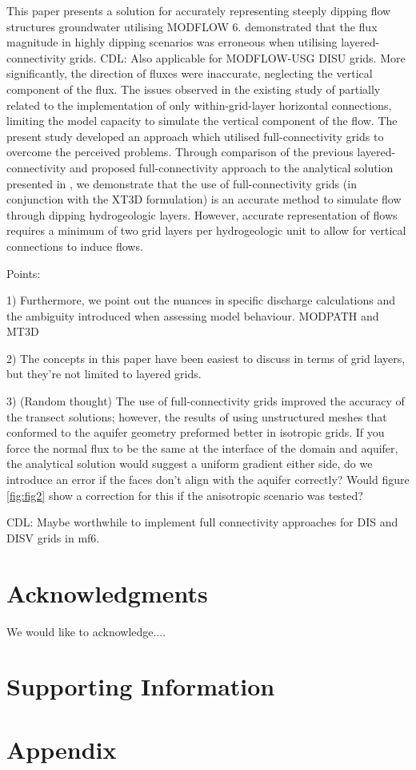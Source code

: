 \documentclass{article}
\begin{document}
This paper presents a solution for accurately representing steeply dipping flow structures groundwater utilising MODFLOW 6. \citep{bardot2022} demonstrated that the flux magnitude in highly dipping scenarios was erroneous when utilising layered-connectivity grids.  {\color{red} CDL: Also applicable for MODFLOW-USG DISU grids.} More significantly, the direction of fluxes were inaccurate, neglecting the vertical component of the flux. The issues observed in the existing study of \citep{bardot2022} partially related to the implementation of only within-grid-layer horizontal connections, limiting the model capacity to simulate the vertical component of the flow. The present study developed an approach which utilised full-connectivity grids \cite{modflow6gwf} to overcome the perceived problems. Through comparison of the previous layered-connectivity and proposed full-connectivity approach to the analytical solution presented in \citep{bardot2022}, we demonstrate that the use of full-connectivity grids (in conjunction with the XT3D formulation) is an accurate method to simulate flow through dipping hydrogeologic layers. However, accurate representation of flows requires a minimum of two grid layers per hydrogeologic unit to allow for vertical connections to induce flows. 

Points:

1) Furthermore, we point out the nuances in specific discharge calculations and the ambiguity introduced when assessing model behaviour.  MODPATH and MT3D

2) The concepts in this paper have been easiest to discuss in terms of grid layers, but they're not limited to layered grids.

3) (Random thought) The use of full-connectivity grids improved the accuracy of the transect solutions; however, the results of \citep{bardot2022} using unstructured meshes that conformed to the aquifer geometry preformed better in isotropic grids. If you force the normal flux to be the same at the interface of the domain and aquifer, the analytical solution would suggest a uniform gradient either side, do we introduce an error if the faces don't align with the aquifer correctly?  Would figure \ref{fig:fig2} show a correction for this if the anisotropic scenario was tested?

 {\color{red} CDL: Maybe worthwhile to implement full connectivity approaches for DIS and DISV grids in mf6.}

\section{Acknowledgments}
We would like to acknowledge....

\section{Supporting Information}

\section{Appendix}


\end{document}
